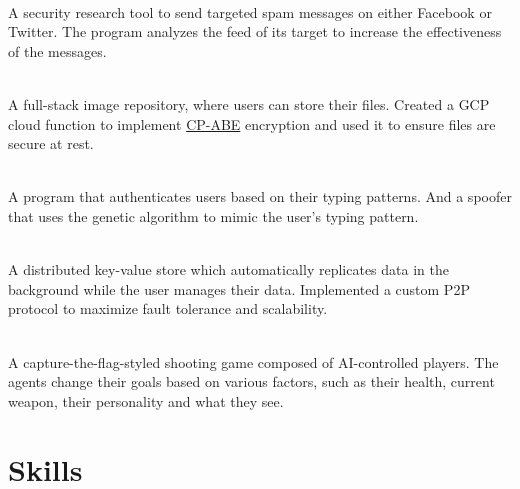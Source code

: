 \documentclass[]{resume-openfont}
\begin{document}
\\
A security research tool to send targeted spam messages on either Facebook or Twitter. The program analyzes the feed of its target to increase the effectiveness of the messages.\\
\sectionsep
  
\hfill \\
A full-stack image repository, where users can store their files. Created a GCP cloud function to implement \href{https://www.cs.utexas.edu/~bwaters/publications/papers/cp-abe.pdf}{CP-ABE} encryption and used it to ensure files are secure at rest.\\
\sectionsep

\\
A program that authenticates users based on their typing patterns. And a spoofer that uses the genetic algorithm to mimic the user's typing pattern.
\sectionsep

\\
A distributed key-value store which automatically replicates data in the background while the user manages their data. Implemented a custom P2P protocol to maximize fault tolerance and scalability.\\
\sectionsep
  

\\
A capture-the-flag-styled shooting game composed of AI-controlled players. The agents change their goals based on various factors, such as their health, current weapon, their personality and what they see.\\
\sectionsep

\section{Skills}
\begin{resumeSkillList}
    \\
    \\
\end{resumeSkillList}
\end{document}
